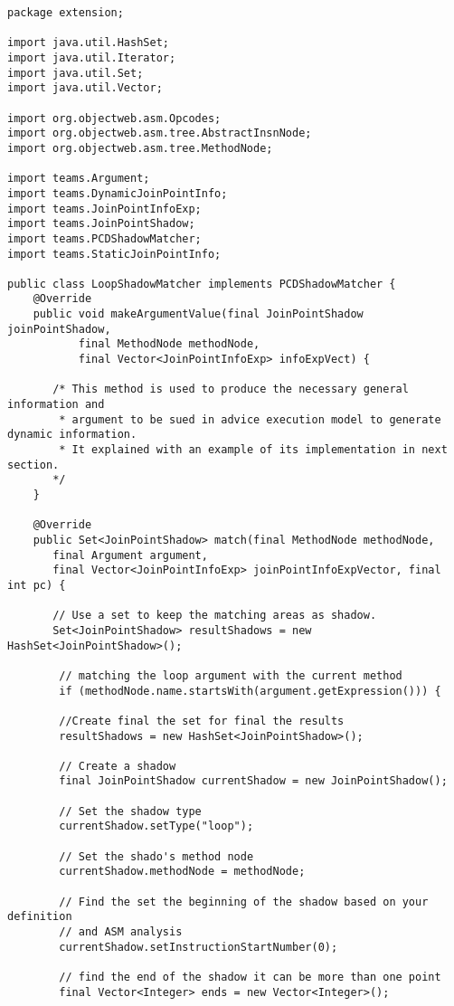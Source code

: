 \documentclass{report}
\begin{document}
\begin{verbatim}
package extension;

import java.util.HashSet;
import java.util.Iterator;
import java.util.Set;
import java.util.Vector;

import org.objectweb.asm.Opcodes;
import org.objectweb.asm.tree.AbstractInsnNode;
import org.objectweb.asm.tree.MethodNode;

import teams.Argument;
import teams.DynamicJoinPointInfo;
import teams.JoinPointInfoExp;
import teams.JoinPointShadow;
import teams.PCDShadowMatcher;
import teams.StaticJoinPointInfo;

public class LoopShadowMatcher implements PCDShadowMatcher {
    @Override
    public void makeArgumentValue(final JoinPointShadow joinPointShadow,
    	   final MethodNode methodNode,
    	   final Vector<JoinPointInfoExp> infoExpVect) {
       
       /* This method is used to produce the necessary general information and
        * argument to be sued in advice execution model to generate dynamic information.
        * It explained with an example of its implementation in next section.
       */
	}
	
	@Override
	public Set<JoinPointShadow> match(final MethodNode methodNode,
	   final Argument argument,
	   final Vector<JoinPointInfoExp> joinPointInfoExpVector, final int pc) {
	   
	   // Use a set to keep the matching areas as shadow.
	   Set<JoinPointShadow> resultShadows = new HashSet<JoinPointShadow>();
	   
	   	// matching the loop argument with the current method
	   	if (methodNode.name.startsWith(argument.getExpression())) {
	   	
	   	//Create final the set for final the results
	   	resultShadows = new HashSet<JoinPointShadow>();
	   	
	   	// Create a shadow
	   	final JoinPointShadow currentShadow = new JoinPointShadow();
	   	
	   	// Set the shadow type
	   	currentShadow.setType("loop");
	   	
	   	// Set the shado's method node
	   	currentShadow.methodNode = methodNode;
	   	
	   	// Find the set the beginning of the shadow based on your definition
	   	// and ASM analysis
	   	currentShadow.setInstructionStartNumber(0);
	   	
	   	// find the end of the shadow it can be more than one point
	   	final Vector<Integer> ends = new Vector<Integer>();
	   	

\end{verbatim}
\end{document}
